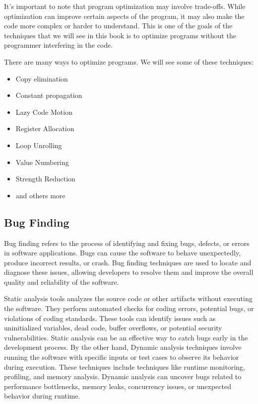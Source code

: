 It's important to note that program optimization may involve trade-offs. While optimization can improve certain aspects of the program, it may also make the code more complex or harder to understand. This is one of the goals of the techniques that we will see in this book is to optimize programs without the programmer interfering in the code. 

There are many ways to optimize programs. We will see some of these techniques:

\begin{itemize}
    \item Copy elimination
    \item Constant propagation
    \item Lazy Code Motion
    \item Register Allocation
    \item Loop Unrolling
    \item Value Numbering
    \item Strength Reduction
    \item and others more
\end{itemize}

\subsection{Bug Finding}
\label{subsec:bug}

Bug finding refers to the process of identifying and fixing bugs, defects, or errors in software applications. Bugs can cause the software to behave unexpectedly, produce incorrect results, or crash. Bug finding techniques are used to locate and diagnose these issues, allowing developers to resolve them and improve the overall quality and reliability of the software. 

Static analysis tools analyzes the source code or other artifacts without executing the software. They perform automated checks for coding errors, potential bugs, or violations of coding standards. These tools can identify issues such as uninitialized variables, dead code, buffer overflows, or potential security vulnerabilities. Static analysis can be an effective way to catch bugs early in the development process. By the other hand, Dynamic analysis techniques involve running the software with specific inputs or test cases to observe its behavior during execution. These techniques include techniques like runtime monitoring, profiling, and memory analysis. Dynamic analysis can uncover bugs related to performance bottlenecks, memory leaks, concurrency issues, or unexpected behavior during runtime.

